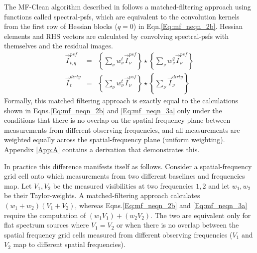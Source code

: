 \documentclass[structabstract]{stylefiles/aa}
\newcommand{\wnt}{{w_{\nu}^t}}
\newcommand{\wnq}{{w_{\nu}^q}}
\begin{document}
%
The MF-Clean algorithm described in \citep{MFCLEAN} follows a
matched-filtering approach using functions called spectral-psfs, 
which are equivalent to the convolution kernels from the first row
of Hessian blocks ($q=0$) in Eqn.\ref{Eq:mf_neqn_2b}.
Hessian elements and RHS vectors are calculated by convolving spectral-psfs with 
themselves and the residual images.
\begin{eqnarray}
\label{Eq:mfclean_2}
\vec{I}^{psf}_{t,q}  &=& \left\{ \sum_{\nu}\wnt \vec{I}^{psf}_{\nu}  \right\} \star \left\{ \sum_{\nu}\wnq \vec{I}^{psf}_{\nu}  \right\}\\
\label{Eq:mfclean_3}
\vec{I}^{dirty}_{t}  &=& \left\{ \sum_{\nu}\wnt \vec{I}^{psf}_{\nu}  \right\} \star \left\{\sum_{\nu} \vec{I}^{dirty}_{\nu}  \right\}
\end{eqnarray}
Formally, this matched filtering approach is exactly equal to the
calculations shown in 
Eqns.\ref{Eq:mf_neqn_2b} and \ref{Eq:mf_neqn_3a} only under the conditions that there
is no overlap on the spatial frequency plane between measurements from different
observing frequencies, and all measurements are weighted equally across the spatial-frequency
plane (uniform weighting).
Appendix \ref{App:A} contains a derivation that demonstrates this.

In practice this difference manifests itself as follows.
Consider a spatial-frequency grid cell onto which measurements from
two different baselines and frequencies map. Let $V_1,V_2$ be the measured visibilities
at two frequencies $1,2$ and let $w_1,w_2$ be their Taylor-weights.
A matched-filtering approach 
calculates $(w_1+w_2)(V_1+V_2)$, whereas Eqns.\ref{Eq:mf_neqn_2b} and \ref{Eq:mf_neqn_3a}
require the computation of $(w_1 V_1) + (w_2 V_2)$.  The two are equivalent only for
flat spectrum sources where $V_1=V_2$ or when there is no overlap between the spatial
frequency grid cells measured 
from different observing frequencies ($V_1$ and $V_2$ map to different spatial frequencies).
\end{document}
